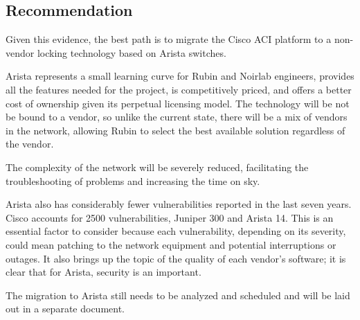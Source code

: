 \subsection{Recommendation}

Given this evidence, the best path is to migrate the Cisco ACI platform to a non-vendor locking technology based on Arista switches. 

Arista represents a small learning curve for Rubin and Noirlab engineers, provides all the features needed for the project, is competitively priced, and offers a better cost of ownership given its perpetual licensing model. 
The technology will be not be bound to a vendor, so unlike the current state, there will be a mix of vendors in the network, allowing Rubin to select the best available solution regardless of the vendor. 

The complexity of the network will be severely reduced, facilitating the troubleshooting of problems and increasing the time on sky.

Arista also has considerably fewer vulnerabilities reported in the last seven years. Cisco accounts for 2500 vulnerabilities, Juniper 300 and Arista 14. This is an essential factor to consider because each vulnerability, depending on its severity, could mean patching to the network equipment and potential interruptions or outages. It also brings up the topic of the quality of each vendor's software; it is clear that for Arista, security is an important.

The migration to Arista still needs to be analyzed and scheduled and will be laid out in a separate document. 